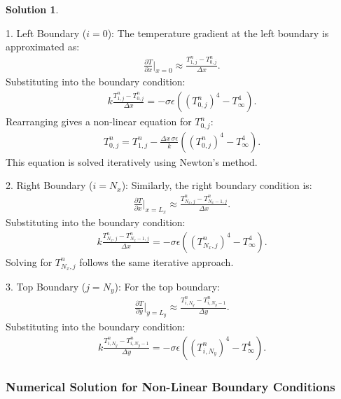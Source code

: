 \documentclass[12pt]{article}
\theoremstyle{definition} %
\newtheorem{solution}{Solution}
\theoremstyle{plain} %
\begin{document}
\begin{solution}
\begin{enumerate}
        1. Left Boundary ($i=0$):  
           The temperature gradient at the left boundary is approximated as:
           \begin{align}
           \frac{\partial T}{\partial x} \bigg|_{x=0} \approx \frac{T_{1,j}^n - T_{0,j}^n}{\Delta x}.
           \end{align}
           Substituting into the boundary condition:
           \begin{align}
           k \frac{T_{1,j}^n - T_{0,j}^n}{\Delta x} = -\sigma \epsilon \left( (T_{0,j}^n)^4 - T_\infty^4 \right).
           \end{align}
           Rearranging gives a non-linear equation for $T_{0,j}^n$:
           \begin{align}
           T_{0,j}^n = T_{1,j}^n - \frac{\Delta x \, \sigma \epsilon}{k} \left( (T_{0,j}^n)^4 - T_\infty^4 \right).
           \end{align}
           This equation is solved iteratively using Newton's method.
        
        2. Right Boundary ($i=N_x$):  
           Similarly, the right boundary condition is:
           \begin{align}
           \frac{\partial T}{\partial x} \bigg|_{x=L_x} \approx \frac{T_{N_x,j}^n - T_{N_x-1,j}^n}{\Delta x}.
           \end{align}
           Substituting into the boundary condition:
           \begin{align}
           k \frac{T_{N_x,j}^n - T_{N_x-1,j}^n}{\Delta x} = -\sigma \epsilon \left( (T_{N_x,j}^n)^4 - T_\infty^4 \right).
           \end{align}
           Solving for $T_{N_x,j}^n$ follows the same iterative approach.
        
        3. Top Boundary ($j=N_y$):  
           For the top boundary:
           \begin{align}
           \frac{\partial T}{\partial y} \bigg|_{y=L_y} \approx \frac{T_{i,N_y}^n - T_{i,N_y-1}^n}{\Delta y}.
           \end{align}
           Substituting into the boundary condition:
           \begin{align}
           k \frac{T_{i,N_y}^n - T_{i,N_y-1}^n}{\Delta y} = -\sigma \epsilon \left( (T_{i,N_y}^n)^4 - T_\infty^4 \right).
           \end{align}
        
        \subsubsection*{Numerical Solution for Non-Linear Boundary Conditions}
        

\end{enumerate}
\end{solution}
\end{document}
